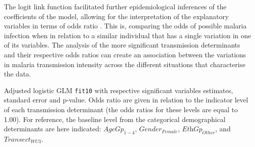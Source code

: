 The logit link function facilitated further epidemiological inferences of the coefficients of the model, allowing for the interpretation of the explanatory variables in terms of odds ratio \cite{collet2003modelling}.
This is, comparing the odds of possible malaria infection when in relation to a similar individual that has a single variation in one of its variables.
The analysis of the more significant transmission determinants and their respective odds ratios can create an association between the variations in malaria transmission intensity across the different situations that characterise the data.
\newpage

\begin{table}[ht!]
\centering
\caption[Adjusted logistic GLM \texttt{fit10}]{Adjusted logistic GLM \texttt{fit10} with respective significant variables estimates, standard error and p-value. Odds ratio are given in relation to the indicator level of each transmission determinant (the odds ratios for these levels are equal to 1.00). For reference, the baseline level from the categorical demographical determinants are here indicated: $\textit{AgeGp}_{1-4}$, $\textit{Gender}_{Female}$, $\textit{EthGp}_{Other}$, and $\textit{Transect}_{WU3}$.}
\label{tab:fit11.glm}
\begin{adjustbox}{width=\linewidth}

\end{adjustbox}
\end{table}

